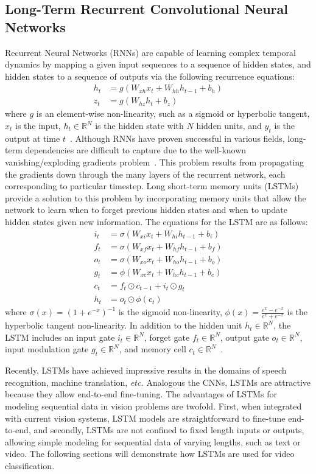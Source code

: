 \subsection{Long-Term Recurrent Convolutional Neural Networks}
Recurrent Neural Networks (RNNs) are capable of learning complex temporal dynamics by mapping a given input sequences to a sequence of hidden states, and hidden states to a sequence of outputs via the following recurrence equations:
\begin{align}
  h_t &= g(W_{xh}x_t + W_{hh}h_{t-1} + b_h) \\
  z_t &= g(W_{hz}h_t + b_z)
\end{align}
where $g$ is an element-wise non-linearity, such as a sigmoid or hyperbolic tangent, $x_t$ is the input, $h_t \in \mathbb{R}^N$ is the hidden state with $N$ hidden units, and $y_t$ is the output at time $t$~\cite{LRCN:2015}. Although RNNs have proven successful in various fields, long-term dependencies are difficult to capture due to the well-known vanishing/exploding gradients problem~\cite{LSTM:1997}. This problem results from propagating the gradients down through the many layers of the recurrent network, each corresponding to particular timestep. Long short-term memory units (LSTMs)~\cite{LSTM:1997} provide a solution to this problem by incorporating memory units that allow the network to learn when to forget previous hidden states and when to update hidden states given new information. The equations for the LSTM are as follows:
\begin{align}
  i_t &= \sigma(W_{xi}x_t + W_{hi}h_{t-1} + b_i) \\
  f_t &= \sigma(W_{xf}x_t + W_{hf}h_{t-1} + b_f) \\
  o_t &= \sigma(W_{xo}x_t + W_{ho}h_{t-1} + b_o) \\
  g_t &= \phi(W_{xc}x_t + W_{hc}h_{t-1} + b_c) \\
  c_t &= f_t \odot c_{t-1} + i_t \odot g_t \\
  h_t &= o_t \odot \phi(c_t)
\end{align}
where $\sigma(x) = (1 + e^{-x})^{-1}$ is the sigmoid non-linearity, $\phi(x) = \frac{e^x - e^{-x}}{e^x + e^{-x}}$ is the hyperbolic tangent non-linearity. In addition to the hidden unit $h_t \in \mathbb{R}^N$, the LSTM includes an input gate $i_t \in \mathbb{R}^N$, forget gate $f_t \in \mathbb{R}^N$, output gate $o_t \in \mathbb{R}^N$, input modulation gate $g_t \in \mathbb{R}^N$, and memory cell $c_t \in \mathbb{R}^N$~\cite{LRCN:2015}.

Recently, LSTMs have achieved impressive results in the domains of speech recognition, machine translation, \textit{etc.} Analogous the CNNs, LSTMs are attractive because they allow end-to-end fine-tuning. The advantages of LSTMs for modeling sequential data in vision problems are twofold. First, when integrated with current vision systems, LSTM models are straightforward to fine-tune end-to-end, and secondly, LSTMs are not confined to fixed length inputs or outputs, allowing simple modeling for sequential data of varying lengths, such as text or video. The following sections will demonstrate how LSTMs are used for video classification.


